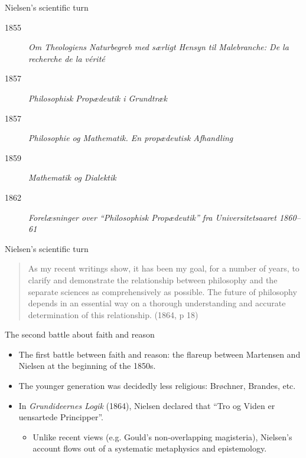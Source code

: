\documentclass[ignorenonframetext, ]{beamer}
\begin{document}
\begin{frame}{Nielsen's scientific turn}

  \begin{description}
  \item[1855] \emph{Om Theologiens Naturbegreb med særligt Hensyn til
      Malebranche: De la recherche de la vérité}
  \item[1857] \textit{Philosophisk Propædeutik i Grundtræk}  
  \item[1857] \emph{Philosophie og Mathematik. En propædeutisk
      Afhandling}
  \item[1859] \textit{Mathematik og Dialektik}
  \item[1862] \textit{Forelæsninger over ``Philosophisk Propædeutik''
      fra Universitetsaaret 1860--61}
\end{description}

\end{frame}

\begin{frame}{Nielsen's scientific turn}

  \begin{quote} As my recent writings show, it has been my goal, for a
    number of years, to clarify and demonstrate the relationship
    between philosophy and the separate sciences as comprehensively as
    possible. The future of philosophy depends in an essential way on
    a thorough understanding and accurate determination of this
    relationship. (1864, p 18)
\end{quote}
\end{frame}

\begin{frame}{The second battle about faith and reason}

  \begin{itemize}
  \item The first battle between faith and reason: the flareup between
    Martensen and Nielsen at the beginning of the 1850s.
  \item The younger generation was decidedly less religious: Brøchner,
    Brandes, etc.
  \item In \emph{Grundideernes Logik} (1864), Nielsen declared that
    ``Tro og Viden er uensartede Principper''.
    \begin{itemize}
    \item Unlike recent views (e.g. Gould's non-overlapping
      magisteria), Nielsen's account flows out of a systematic
      metaphysics and epistemology. \end{itemize}
\end{itemize}
\end{frame}
\end{document}
